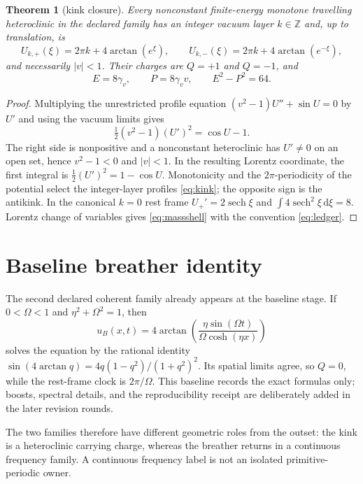 \documentclass[10pt]{article}
\newtheorem{theorem}{Theorem}
\newcommand{\dd}{\,\mathrm d}
\newcommand{\sech}{\operatorname{sech}}
\begin{document}
\begin{theorem}[kink closure]\label{thm:kink}
Every nonconstant finite-energy monotone travelling heteroclinic in the
declared family has an integer vacuum layer $k\in\mathbb Z$ and, up to
translation, is
\begin{equation}
 U_{k,+}(\xi)=2\pi k+4\arctan(e^\xi),\qquad
 U_{k,-}(\xi)=2\pi k+4\arctan(e^{-\xi}),
 \label{eq:kink}
\end{equation}
and necessarily $|v|<1$.  Their charges are $Q=+1$ and $Q=-1$, and
\begin{equation}
 E=8\gamma_v,\qquad P=8\gamma_vv,\qquad E^2-P^2=64 .
 \label{eq:massshell}
\end{equation}
\end{theorem}
\begin{proof}
Multiplying the unrestricted profile equation
$(v^2-1)U''+\sin U=0$ by $U'$ and using the vacuum limits gives
\[
 \tfrac12(v^2-1)(U')^2=\cos U-1.
\]
The right side is nonpositive and a nonconstant heteroclinic has $U'\ne0$ on
an open set, hence $v^2-1<0$ and $|v|<1$.  In the resulting Lorentz coordinate,
the first integral is $\tfrac12(U')^2=1-\cos U$.  Monotonicity and the
$2\pi$-periodicity of the potential select the integer-layer profiles
\eqref{eq:kink}; the opposite sign is the antikink.  In the canonical $k=0$
rest frame $U_+'=2\sech\xi$ and
$\int 4\sech^2\xi\dd\xi=8$.  Lorentz change of variables gives
\eqref{eq:massshell} with the convention \eqref{eq:ledger}.
\end{proof}

\ifnum{}
\section{Baseline breather identity}
The second declared coherent family already appears at the baseline stage.  If
$0<\Omega<1$ and $\eta^2+\Omega^2=1$, then
\begin{equation}
 u_B(x,t)=4\arctan\!\left(\frac{\eta\sin(\Omega t)}
 {\Omega\cosh(\eta x)}\right)
 \label{eq:baselinebreather}
\end{equation}
solves the equation by the rational identity
$\sin(4\arctan q)=4q(1-q^2)/(1+q^2)^2$.  Its spatial limits agree, so
$Q=0$, while the rest-frame clock is $2\pi/\Omega$.  This baseline records
the exact formulas only; boosts, spectral details, and the reproducibility
receipt are deliberately added in the later revision rounds.

The two families therefore have different geometric roles from the outset:
the kink is a heteroclinic carrying charge, whereas the breather returns in a
continuous frequency family.  A continuous frequency label is not an
isolated primitive-periodic owner.
\fi
\end{document}
